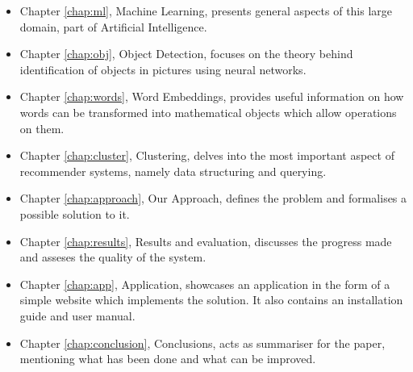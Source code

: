 \begin{itemize}
\item{Chapter \ref{chap:ml}, Machine Learning, presents general aspects of this large domain, part of Artificial Intelligence.}
\item{Chapter \ref{chap:obj}, Object Detection, focuses on the theory behind identification of objects in pictures using neural networks.}
\item{Chapter \ref{chap:words}, Word Embeddings, provides useful information on how words can be transformed into mathematical objects which allow operations on them.}
\item{Chapter \ref{chap:cluster}, Clustering, delves into the most important aspect of recommender systems, namely data structuring and querying.}
\item{Chapter \ref{chap:approach}, Our Approach, defines the problem and formalises a possible solution to it.}
\item{Chapter \ref{chap:results}, Results and evaluation, discusses the progress made and asseses the quality of the system.}
\item{Chapter \ref{chap:app}, Application, showcases an application in the form of a simple website which implements the solution. It also contains an installation guide and user manual.}
\item{Chapter \ref{chap:conclusion}, Conclusions, acts as summariser for the paper, mentioning what has been done and what can be improved.}
\end{itemize}